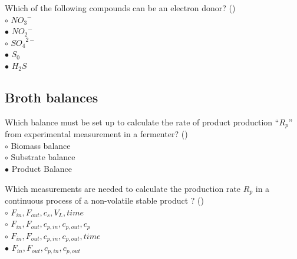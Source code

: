 \documentclass[]{beamer}
\begin{document}
\begin{frame}[shrink] {}
\addtocounter{answers}{1}
\color{blue}
Which of the following compounds can be an electron donor?   ()\\
\color{black}
\setlength{\parindent}{-0.4cm}
{\color{red}$\circ$}  ${NO_{3}}^{-}$\\
{\color{red}$\bullet$} ${NO_{2}}^{-}$\\
{\color{red}$\circ$} ${SO_{4}}^{2-}$\\
{\color{red}$\bullet$} $S_0$\\
{\color{red}$\bullet$} $H_{2}S$ \\
\end{frame}

\subsection{Broth balances}
\setcounter{answers}{0}

\begin{frame}[shrink] {}
\addtocounter{answers}{1}
\color{blue}
Which balance must be set up to calculate the rate of product production “$R_p$” from experimental measurement in a fermenter? ()\\
\color{black}
\setlength{\parindent}{-0.4cm}
{\color{red}$\circ$} Biomass balance\\
{\color{red}$\circ$} Substrate balance\\
{\color{red}$\bullet$} Product Balance \\
\end{frame}

\begin{frame}[shrink] {}
\addtocounter{answers}{1}
\color{blue}
Which measurements are needed to calculate the production rate $R_p$ in a continuous process of a non-volatile stable product ? ()\\
\color{black}
\setlength{\parindent}{-0.4cm}
{\color{red}$\circ$}  $F_{in},F_{out},c_{s},V_{L},time$  \\
{\color{red}$\circ$}  $F_{in},F_{out},c_{p,in},c_{p,out},c_p$ \\
{\color{red}$\circ$}  $F_{in},F_{out},c_{p,in},c_{p,out},time$ \\
{\color{red}$\bullet$}  $F_{in},F_{out},c_{p,in},c_{p,out}$\\
\end{frame}
\end{document}
